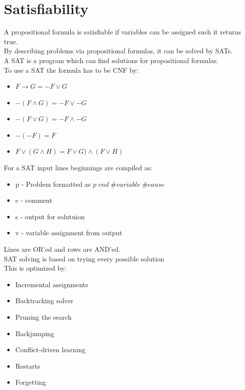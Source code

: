 \documentclass[12pt, a4paper]{article}
\begin{document}
		\section{Satisfiability}
			A propositional formula is satisfiable if variables can be assigned such it returns true.\\
			By describing problems via propositional formulas, it can be solved by SATs.\\
			A SAT is a program which can find solutions for propositional formulas.\\
			To use a SAT the formula has to be CNF by:\\
			\begin{itemize}
				\item $F\rightarrow G = -F\lor G$
				\item $-(F\land G) = -F\lor -G$
				\item $-(F\lor G) = -F \land -G$
				\item $-(-F)=F$
				\item $F\lor (G\land H) = F\lor G)\land (F\lor H)$
			\end{itemize}
			For a SAT input lines beginnings are compiled as:
			\begin{itemize}
				\item p - Problem formatted as $p\; cnd\; \#variable\; \#cause$
				\item c - comment
				\item s - output for solutuion
				\item v - variable assignment from output
			\end{itemize}
			Lines are OR'ed and rows are AND'ed.\\
			SAT solving is based on trying every possible solution\\
			This is optimized by:
			\begin{itemize}
				\item Incremental assignments
				\item Backtracking solver
				\item Pruning the search
				\item Backjumping
				\item Conflict-driven learning
				\item Restarts
				\item Forgetting
			\end{itemize}
\end{document}
